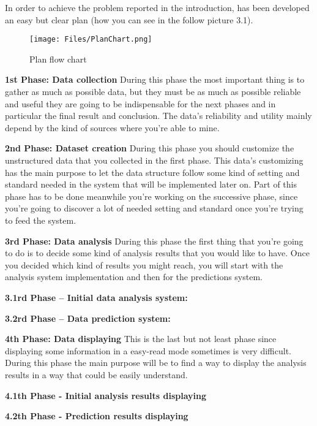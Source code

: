 


In order to achieve the problem reported in the introduction, has been developed an easy but clear plan (how you can see in the follow picture 3.1).\\

\begin{figure}[h]
    \centering
    \texttt{[image: Files/PlanChart.png]}
    \caption[Plan flow chart]{Plan flow chart}
    \label{fig: Plan_Flow_Chart}
\end{figure}

\newpage
\textbf{1st Phase: Data collection}
During this phase the most important thing is to gather as much as possible data, 	but they must be as much as possible reliable and useful they are going to be indispensable for the next phases and in particular the final result and conclusion.
The data’s reliability and utility mainly depend by the kind of sources where you’re able to mine.

\textbf{2nd Phase: Dataset creation}
During this phase you should customize the unstructured data that you collected in the first phase. This data’s customizing has the main purpose to let the data structure follow some kind of setting and standard needed in the system that will be implemented later on.
Part of this phase has to be done meanwhile you’re working on the successive phase, since you’re going to discover a lot of needed setting and standard once you’re trying to feed the system.

\textbf{3rd Phase: Data analysis}
During this phase the first thing that you’re going to do is to decide some kind of analysis results that you would like to have.
Once you decided which kind of results you might reach, you will start with the analysis system implementation and then for the predictions system.

	\qquad \textbf {3.1rd Phase – Initial data analysis system:}

	\qquad \textbf {3.2rd Phase – Data prediction system:}

\textbf{4th Phase: Data displaying}
This is the last but not least phase since displaying some information in a easy-read mode sometimes is very difficult.
During this phase the main purpose will be to find a way to display the analysis results in a way that could be easily understand.

	\qquad \textbf {4.1th Phase - Initial analysis results displaying}
	
	\qquad \textbf {4.2th Phase - Prediction results displaying}
\newpage 